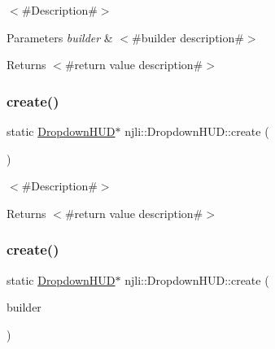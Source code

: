 $<$\#\+Description\#$>$


\begin{DoxyParams}{Parameters}
{\em builder} & $<$\#builder description\#$>$\\
\hline
\end{DoxyParams}
\begin{DoxyReturn}{Returns}
$<$\#return value description\#$>$ 
\end{DoxyReturn}
\mbox{\label{classnjli_1_1_dropdown_h_u_d_a00af5f57aaf031925d0c5713fa333a6d}} 
\subsubsection{\texorpdfstring{create()}{create()}\hspace{0.1cm}{\footnotesize\ttfamily [2/3]}}
{\footnotesize\ttfamily static \mbox{\hyperlink{classnjli_1_1_dropdown_h_u_d}{Dropdown\+H\+UD}}$\ast$ njli\+::\+Dropdown\+H\+U\+D\+::create (\begin{DoxyParamCaption}{ }\end{DoxyParamCaption})\hspace{0.3cm}{\ttfamily [static]}}

$<$\#\+Description\#$>$

\begin{DoxyReturn}{Returns}
$<$\#return value description\#$>$ 
\end{DoxyReturn}
\mbox{\label{classnjli_1_1_dropdown_h_u_d_a71e72935db6a1fe32732bb3bb9e6f08f}} 
\subsubsection{\texorpdfstring{create()}{create()}\hspace{0.1cm}{\footnotesize\ttfamily [3/3]}}
{\footnotesize\ttfamily static \mbox{\hyperlink{classnjli_1_1_dropdown_h_u_d}{Dropdown\+H\+UD}}$\ast$ njli\+::\+Dropdown\+H\+U\+D\+::create (\begin{DoxyParamCaption}\item[{const \mbox{\hyperlink{classnjli_1_1_dropdown_h_u_d_builder}{Dropdown\+H\+U\+D\+Builder}} \&}]{builder }\end{DoxyParamCaption})\hspace{0.3cm}{\ttfamily [static]}}

